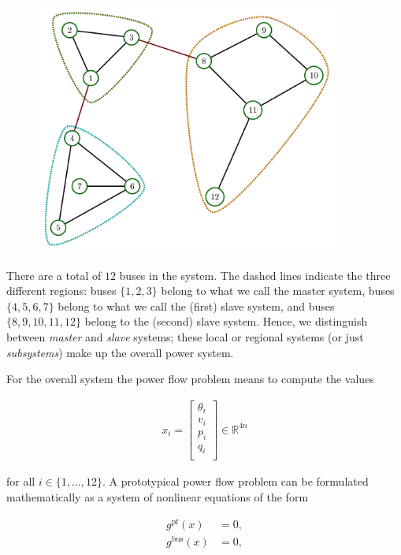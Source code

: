 \documentclass{article}
\newcommand{\n}{n}
\newcommand{\state}{x}
\newcommand{\pf}{g^{\text{pf}}}
\newcommand{\busspecs}{g^{\text{bus}}}
\begin{document}
\begin{figure}
    \includegraphics[width=10cm]{visualization/original.png}
\end{figure}

There are a total of $12$ buses in the system.
The dashed lines indicate the three different regions: buses $\{ 1, 2, 3 \}$ belong to what we call the master system, buses $\{4, 5, 6, 7 \}$ belong to what we call the (first) slave system, and buses $\{ 8, 9, 10, 11, 12 \}$ belong to the (second) slave system.
Hence, we distinguish between \emph{master} and \emph{slave} systems; these local or regional systems (or just \emph{subsystems}) make up the overall power system.

For the overall system the power flow problem means to compute the values

\begin{align}
    \state_i = \begin{bmatrix}
        \theta_i \\
        v_i \\
        p_i \\
        q_i \\
    \end{bmatrix}
    \in \mathbb{R}^{4 \n}
\end{align}

for all $i \in \{1, \dots, 12 \}$.
A prototypical power flow problem can be formulated mathematically as a system of nonlinear equations of the form

\begin{subequations}
    \begin{align}
        \pf( \state ) &= 0, \\
        \busspecs ( \state ) &= 0,
    \end{align}
\end{subequations}
\end{document}

